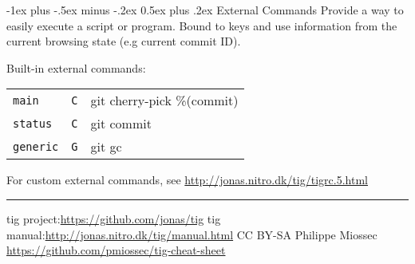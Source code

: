 \documentclass[10pt,landscape]{article}
\makeatletter
\renewcommand{\section}{\@startsection{section}{1}{0mm}%
                                {-1ex plus -.5ex minus -.2ex}%
                                {0.5ex plus .2ex}%
                                {\normalfont\large\bfseries}}
\makeatother
\begin{document}
\begin{multicols}{3}
\section{External Commands}
Provide a way to easily execute a script or program.
Bound to keys and use information from the current browsing state (e.g current commit ID).

Built-in external commands:
\begin{tabular}{@{}lll@{}}
\verb!main! & \verb!C! & git cherry-pick  \%(commit)\\
\verb!status! & \verb!C! & git commit \\
\verb!generic! & \verb!G! & git gc \\
\end{tabular}

For custom external commands, see \url{http://jonas.nitro.dk/tig/tigrc.5.html}

\rule{0.3\linewidth}{0.25pt}
\scriptsize

tig project:\url{https://github.com/jonas/tig}
tig manual:\url{http://jonas.nitro.dk/tig/manual.html}
\linebreak
CC BY-SA Philippe Miossec \url{https://github.com/pmiossec/tig-cheat-sheet}

\end{multicols}
\end{document}
